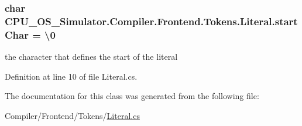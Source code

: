 \subsubsection[{start\+Char}]{\setlength{\rightskip}{0pt plus 5cm}char C\+P\+U\+\_\+\+O\+S\+\_\+\+Simulator.\+Compiler.\+Frontend.\+Tokens.\+Literal.\+start\+Char = \textquotesingle{}\textbackslash{}0\textquotesingle{}\hspace{0.3cm}{\ttfamily [protected]}}\label{class_c_p_u___o_s___simulator_1_1_compiler_1_1_frontend_1_1_tokens_1_1_literal_ae93e9ee8a14f8f8fed07f5e9a8232b5a}


the character that defines the start of the literal 



Definition at line 10 of file Literal.\+cs.



The documentation for this class was generated from the following file\+:\begin{DoxyCompactItemize}
\item 
Compiler/\+Frontend/\+Tokens/\hyperlink{_literal_8cs}{Literal.\+cs}\end{DoxyCompactItemize}
